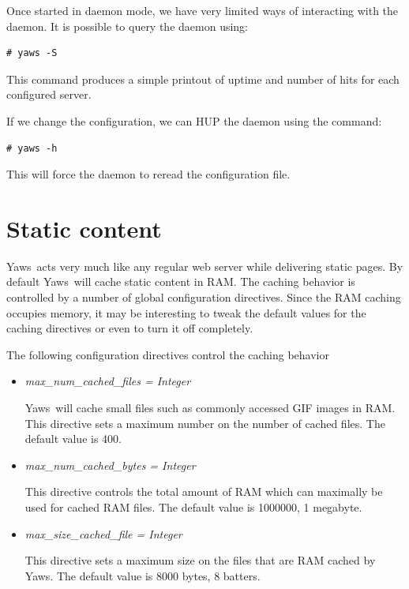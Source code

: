 \documentclass[11pt,oneside,english]{book}
\newcommand{\Yaws}            %
        {{\sc Yaws}}
\begin{document}
Once started in daemon mode, we have very limited ways of interacting
with the daemon. It is possible to query the daemon using:
\begin{verbatim}
# yaws -S
\end{verbatim}

This command produces a simple printout of uptime and number of hits
for each configured server.

If we change the configuration, we can HUP the daemon using the
command:
\begin{verbatim}
# yaws -h
\end{verbatim}

This will force the daemon to reread the configuration file.



\chapter{Static content}

\Yaws\  acts very much like any regular web server while delivering
static pages. By default \Yaws\  will cache static content in RAM.
The caching behavior is controlled by a number of global
configuration directives. Since the RAM caching occupies memory,
it may be interesting to tweak the default values for the caching directives
or even to turn it off completely.

The following configuration directives control the caching behavior
\begin{itemize}
\item \textit{max\_num\_cached\_files = Integer}

\Yaws\   will  cache  small  files  such  as  commonly
              accessed  GIF images in RAM.  This directive sets a
              maximum number on the number of cached files.   The
              default value is 400.

\item\textit{max\_num\_cached\_bytes = Integer}

 This  directive  controls  the  total amount of RAM
             which can maximally be used for cached  RAM  files.
              The default value is 1000000, 1 megabyte.


\item\textit{max\_size\_cached\_file = Integer}

 This  directive  sets  a  maximum size on the files
              that are RAM cached by \Yaws{}.  The default value is
              8000 bytes, 8 batters.



\end{itemize}
\end{document}
